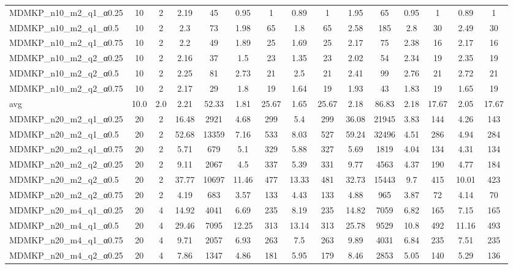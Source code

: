 \begin{table}[!ht]
{\begin{tabular}{lcccccccccccccc}
MDMKP\_n10\_m2\_q1\_α0.25 & 10 & 2 & 2.19 & 45 & 0.95 & 1 & 0.89 & 1 & 1.95 & 65 & 0.95 & 1 & 0.89 & 1 \\
MDMKP\_n10\_m2\_q1\_α0.5 & 10 & 2 & 2.3 & 73 & 1.98 & 65 & 1.8 & 65 & 2.58 & 185 & 2.8 & 30 & 2.49 & 30 \\
MDMKP\_n10\_m2\_q1\_α0.75 & 10 & 2 & 2.2 & 49 & 1.89 & 25 & 1.69 & 25 & 2.17 & 75 & 2.38 & 16 & 2.17 & 16 \\
MDMKP\_n10\_m2\_q2\_α0.25 & 10 & 2 & 2.16 & 37 & 1.5 & 23 & 1.35 & 23 & 2.02 & 54 & 2.34 & 19 & 2.35 & 19 \\
MDMKP\_n10\_m2\_q2\_α0.5 & 10 & 2 & 2.25 & 81 & 2.73 & 21 & 2.5 & 21 & 2.41 & 99 & 2.76 & 21 & 2.72 & 21 \\
MDMKP\_n10\_m2\_q2\_α0.75 & 10 & 2 & 2.17 & 29 & 1.8 & 19 & 1.64 & 19 & 1.93 & 43 & 1.83 & 19 & 1.65 & 19 \\
\hline avg & 10.0 & 2.0 & 2.21& 52.33 & 1.81& 25.67 & 1.65& 25.67 & 2.18& 86.83 & 2.18& 17.67 & 2.05& 17.67\\ \hline
MDMKP\_n20\_m2\_q1\_α0.25 & 20 & 2 & 16.48 & 2921 & 4.68 & 299 & 5.4 & 299 & 36.08 & 21945 & 3.83 & 144 & 4.26 & 143 \\
MDMKP\_n20\_m2\_q1\_α0.5 & 20 & 2 & 52.68 & 13359 & 7.16 & 533 & 8.03 & 527 & 59.24 & 32496 & 4.51 & 286 & 4.94 & 284 \\
MDMKP\_n20\_m2\_q1\_α0.75 & 20 & 2 & 5.71 & 679 & 5.1 & 329 & 5.88 & 327 & 5.69 & 1819 & 4.04 & 134 & 4.31 & 134 \\
MDMKP\_n20\_m2\_q2\_α0.25 & 20 & 2 & 9.11 & 2067 & 4.5 & 337 & 5.39 & 331 & 9.77 & 4563 & 4.37 & 190 & 4.77 & 184 \\
MDMKP\_n20\_m2\_q2\_α0.5 & 20 & 2 & 37.77 & 10697 & 11.46 & 477 & 13.33 & 481 & 32.73 & 15443 & 9.7 & 415 & 10.01 & 423 \\
MDMKP\_n20\_m2\_q2\_α0.75 & 20 & 2 & 4.19 & 683 & 3.57 & 133 & 4.43 & 133 & 4.88 & 965 & 3.87 & 72 & 4.14 & 70 \\
MDMKP\_n20\_m4\_q1\_α0.25 & 20 & 4 & 14.92 & 4041 & 6.69 & 235 & 8.19 & 235 & 14.82 & 7059 & 6.82 & 165 & 7.15 & 165 \\
MDMKP\_n20\_m4\_q1\_α0.5 & 20 & 4 & 29.46 & 7095 & 12.25 & 313 & 13.14 & 313 & 25.78 & 9529 & 10.8 & 492 & 11.16 & 493 \\
MDMKP\_n20\_m4\_q1\_α0.75 & 20 & 4 & 9.71 & 2057 & 6.93 & 263 & 7.5 & 263 & 9.89 & 4031 & 6.84 & 235 & 7.51 & 235 \\
MDMKP\_n20\_m4\_q2\_α0.25 & 20 & 4 & 7.86 & 1347 & 4.86 & 181 & 5.95 & 179 & 8.46 & 2853 & 5.05 & 140 & 5.29 & 136 \\

\end{tabular}}
\end{table}
